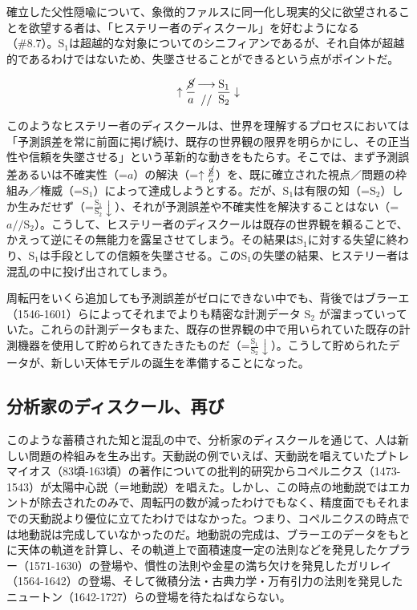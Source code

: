 確立した父性隠喩について、象徴的ファルスに同一化し現実的父に欲望されることを欲望する者は、「ヒステリー者のディスクール」を好むようになる（\#8.7）。\(\textrm{S}_1\)は超越的な対象についてのシニフィアンであるが、それ自体が超越的であるわけではないため、失墜させることができるという点がポイントだ。

\[
\uparrow\frac{\mathrm{\cancel{S}}}{a}\genfrac{}{}{0pt}{}{\longrightarrow}{//}\frac{\mathrm{S_1}}{\mathrm{S_2}}\downarrow
\]

このようなヒステリー者のディスクールは、世界を理解するプロセスにおいては「予測誤差を常に前面に掲げ続け、既存の世界観の限界を明らかにし、その正当性や信頼を失墜させる」という革新的な動きをもたらす。そこでは、まず予測誤差あるいは不確実性（=\(a\)）の解決（=\(\uparrow\frac{\cancel{\textrm{S}}}{a}\)）を、既に確立された視点／問題の枠組み／権威（=\(\textrm{S}_1\)）によって達成しようとする。だが、\(\textrm{S}_1\)は有限の知（=\(\textrm{S}_2\)）しか生みだせず（=\(\frac{\textrm{S}_1}{\textrm{S}_2}\downarrow\)）、それが予測誤差や不確実性を解決することはない（=\(a//\textrm{S}_2\)）。こうして、ヒステリー者のディスクールは既存の世界観を頼ることで、かえって逆にその無能力を露呈させてしまう。その結果は\(\textrm{S}_1\)に対する失望に終わり、\(\textrm{S}_1\)は手段としての信頼を失墜させる。この\(\textrm{S}_1\)の失墜の結果、ヒステリー者は混乱の中に投げ出されてしまう。

周転円をいくら追加しても予測誤差がゼロにできない中でも、背後ではブラーエ（1546-1601）らによってそれまでよりも精密な計測データ
\(\textrm{S}_2\)
が溜まっていっていた。これらの計測データもまた、既存の世界観の中で用いられていた既存の計測機器を使用して貯められてきたきたものだ（=\(\frac{\textrm{S}_1}{\textrm{S}_2}\downarrow\)）。こうして貯められたデータが、新しい天体モデルの誕生を準備することになった。

\subsection{分析家のディスクール、再び}\label{ux5206ux6790ux5bb6ux306eux30c7ux30a3ux30b9ux30afux30fcux30ebux518dux3073}

このような蓄積された知と混乱の中で、分析家のディスクールを通じて、人は新しい問題の枠組みを生み出す。天動説の例でいえば、天動説を唱えていたプトレマイオス（83頃-163頃）の著作についての批判的研究からコペルニクス（1473-1543）が太陽中心説（＝地動説）を唱えた。しかし、この時点の地動説ではエカントが除去されたのみで、周転円の数が減ったわけでもなく、精度面でもそれまでの天動説より優位に立てたわけではなかった。つまり、コペルニクスの時点では地動説は完成していなかったのだ。地動説の完成は、ブラーエのデータをもとに天体の軌道を計算し、その軌道上で面積速度一定の法則などを発見したケプラー（1571-1630）の登場や、慣性の法則や金星の満ち欠けを発見したガリレイ（1564-1642）の登場、そして微積分法・古典力学・万有引力の法則を発見したニュートン（1642-1727）らの登場を待たねばならない。

